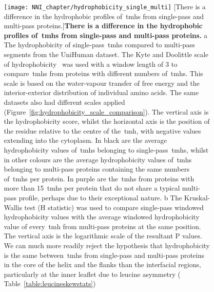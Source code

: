 \begin{figure}[!ht]
\centering
\texttt{[image: NNI\_chapter/hydrophobicity\_single\_multi]}
[There is a difference in the hydrophobic profiles of~\gls{tmh}s from single-pass and multi-pass proteins.]{\textbf{There is a difference in the hydrophobic profiles of~\gls{tmh}s from single-pass and multi-pass proteins.}
 a The hydrophobicity of single-pass~\gls{tmh}s compared to multi-pass segments from the UniHuman dataset.
The Kyte and Doolittle scale of hydrophobicity~\cite{Kyte1982} was used with a window length of 3 to compare~\gls{tmh}s from proteins with different numbers of~\gls{tmh}s.
This scale is based on the water-vapour transfer of free energy and the interior-exterior distribution of individual amino acids.
The same datasets also had different scales applied (Figure~\ref{fig:hydrophobicity_scale_comparison}).
The vertical axis is the hydrophobicity score, whilst the horizontal axis is the position of the residue relative to the centre of the~\gls{tmh}, with negative values extending into the cytoplasm.
In black are the average hydrophobicity values of~\gls{tmh}s belonging to single-pass~\gls{tmh}s, whilst in other colours are the average hydrophobicity values of~\gls{tmh}s belonging to multi-pass proteins containing the same numbers of~\gls{tmh}s per protein.
In purple are the~\gls{tmh}s from proteins with more than 15~\gls{tmh}s per protein that do not share a typical multi-pass profile, perhaps due to their exceptional nature.
b The Kruskal-Wallis test (H statistic) was used to compare single-pass windowed hydrophobicity values with the average windowed hydrophobicity value of every~\gls{tmh} from multi-pass proteins at the same position.
The vertical axis is the logarithmic scale of the resultant P values.
We can much more readily reject the hypothesis that hydrophobicity is the same between~\gls{tmh}s from single-pass and multi-pass proteins in the core of the helix and the flanks than the interfacial regions, particularly at the inner leaflet due to leucine asymmetry ( Table~\ref{table:leucineskewstats})}

\label{fig:hydrophobicity_single_multi}
\end{figure}

